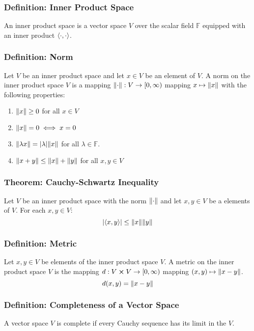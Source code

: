 \documentclass[11pt, a4paper]{article}
\newcommand{\F}{\mathbb{F}} %
\begin{document}
\subsubsection{Definition: Inner Product Space}
An inner product space is a vector space $ V $ over the scalar field $ \mathbb{F} $ equipped with an inner product $ \expval{\cdot,\cdot} $.

\subsubsection{Definition: Norm}
Let $ V $ be an inner product space and let $ x \in V $ be an element of $ V $. A norm on the inner product space $ V $ is a mapping $ \norm{\cdot} : V \to [0, \infty) $ mapping $ x \mapsto \norm{x} $ with the following properties:
\begin{enumerate}
	\item $ \norm{x} \geq 0 $ for all $ x \in V $
	\item $ \norm{x} = 0 \iff x = 0$
	\item $ \norm{\lambda x} = \abs{\lambda} \norm{x} $ for all $ \lambda \in \F $.
	\item $ \norm{x + y} \leq \norm{x} + \norm{y}$ for all $ x, y \in V$
\end{enumerate} 

\subsubsection{Theorem: Cauchy-Schwartz Inequality}
Let $ V $ be an inner product space with the norm $ \norm{\cdot} $ and let $ x, y \in V $ be a elements of $ V $. For each $ x, y \in V $:
\begin{equation*}
	\abs{\expval{x, y}} \leq \norm{x} \norm{y}
\end{equation*}
		
\subsubsection{Definition: Metric}
Let $ x, y \in V $ be elements of the inner product space $ V $. A metric on the inner product space $ V $ is the mapping $ d : V \cross V \to [0, \infty) $ mapping $ (x, y) \mapsto \norm{x - y} $.
\begin{equation*}
	d(x, y) = \norm{x - y}
\end{equation*}

\subsubsection{Definition: Completeness of a Vector Space}
A vector space $ V $ is complete if every Cauchy sequence has its limit in the $ V $.
\end{document}
